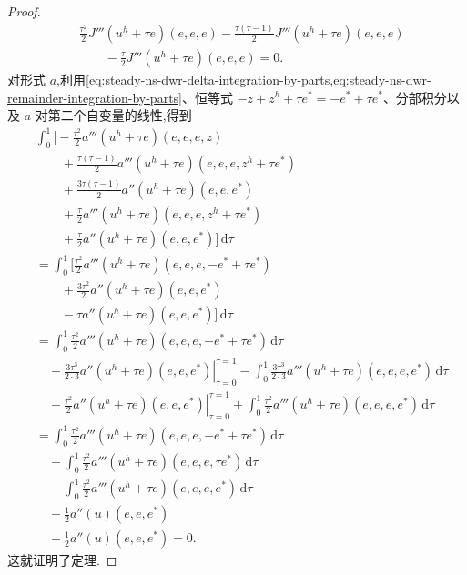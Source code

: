 \begin{proof}
\[
\begin{aligned}
  &\frac{\tau^2}{2}J'''(u^h+\tau e)(e,e,e)
   -\frac{\tau(\tau-1)}{2}J'''(u^h+\tau e)(e,e,e)\\
  &\qquad-\frac{\tau}{2}J'''(u^h+\tau e)(e,e,e)=0.
\end{aligned}
\]
对形式 $a$,利用\cref{eq:steady-ns-dwr-delta-integration-by-parts,eq:steady-ns-dwr-remainder-integration-by-parts}、恒等式 $-z+z^h+\tau e^*=-e^*+\tau e^*$、分部积分以及 $a$ 对第二个自变量的线性,得到
\begingroup\small
\[
\begin{aligned}
 &\int_0^1\Biggl[
   -\frac{\tau^2}{2}a'''(u^h+\tau e)(e,e,e,z)\\
  &\qquad+\frac{\tau(\tau-1)}{2}
        a'''(u^h+\tau e)(e,e,e,z^h+\tau e^*)\\
  &\qquad+\frac{3\tau(\tau-1)}{2}
        a''(u^h+\tau e)(e,e,e^*)\\
  &\qquad+\frac{\tau}{2}
        a'''(u^h+\tau e)(e,e,e,z^h+\tau e^*)\\
  &\qquad+\frac{\tau}{2}
        a''(u^h+\tau e)(e,e,e^*)\Biggr]\,\mathrm{d}\tau\\
 &=\int_0^1\Biggl[
     \frac{\tau^2}{2}a'''(u^h+\tau e)(e,e,e,-e^*+\tau e^*)\\
  &\qquad+\frac{3\tau^2}{2}a''(u^h+\tau e)(e,e,e^*)\\
  &\qquad-\tau a''(u^h+\tau e)(e,e,e^*)\Biggr]\,\mathrm{d}\tau\\
 &=\int_0^1\frac{\tau^2}{2}
       a'''(u^h+\tau e)(e,e,e,-e^*+\tau e^*)\,\mathrm{d}\tau\\
 &\quad+\left.\frac{3\tau^3}{2\cdot3}
       a''(u^h+\tau e)(e,e,e^*)\right|_{\tau=0}^{\tau=1}
       -\int_0^1\frac{3\tau^3}{2\cdot3}
       a'''(u^h+\tau e)(e,e,e,e^*)\,\mathrm{d}\tau\\
 &\quad-\left.\frac{\tau^2}{2}a''(u^h+\tau e)(e,e,e^*)
       \right|_{\tau=0}^{\tau=1}
       +\int_0^1\frac{\tau^2}{2}
       a'''(u^h+\tau e)(e,e,e,e^*)\,\mathrm{d}\tau\\
 &=\int_0^1\frac{\tau^2}{2}a'''(u^h+\tau e)
       (e,e,e,-e^*+\tau e^*)\,\mathrm{d}\tau\\
 &\quad-\int_0^1\frac{\tau^2}{2}a'''(u^h+\tau e)
       (e,e,e,\tau e^*)\,\mathrm{d}\tau\\
 &\quad+\int_0^1\frac{\tau^2}{2}a'''(u^h+\tau e)
       (e,e,e,e^*)\,\mathrm{d}\tau\\
 &\quad+\frac12a''(u)(e,e,e^*)\\
 &\quad-\frac12a''(u)(e,e,e^*)=0.
\end{aligned}
\]
\endgroup
这就证明了定理.
\end{proof}

